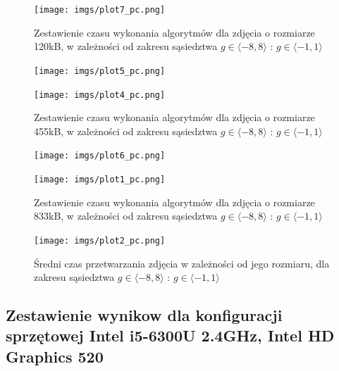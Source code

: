 \documentclass[document.tex]{subfiles}
\begin{document}
\begin{figure}[h]
\texttt{[image: imgs/plot7\_pc.png]}
\caption{Zestawienie czasu wykonania algorytmów dla zdjęcia o rozmiarze 120kB, 
        w zależności od zakresu sąsiedztwa $g\in \langle -8, 8 \rangle$ : $g\in \langle -1, 1 \rangle$ }
\label{fig:results_pc_hybrid}
\end{figure}

\begin{figure}[h]
\texttt{[image: imgs/plot5\_pc.png]}
\caption*{}
\label{fig:results_pc_hybrid}
\end{figure}

\begin{figure}[h]
\texttt{[image: imgs/plot4\_pc.png]}
\caption{Zestawienie czasu wykonania algorytmów dla zdjęcia o rozmiarze 455kB, 
        w zależności od zakresu sąsiedztwa $g\in \langle -8, 8 \rangle$ : $g\in \langle -1, 1 \rangle$ }
\label{fig:results_pc_hybrid}
\end{figure}

\begin{figure}[h]
\texttt{[image: imgs/plot6\_pc.png]}
\caption*{}
\label{fig:results_pc_hybrid}
\end{figure}

\begin{figure}[h]
\texttt{[image: imgs/plot1\_pc.png]}
\caption{Zestawienie czasu wykonania algorytmów dla zdjęcia o rozmiarze 833kB, 
        w zależności od zakresu sąsiedztwa $g\in \langle -8, 8 \rangle$ : $g\in \langle -1, 1 \rangle$ }
\label{fig:results_pc_hybrid}
\end{figure}

\begin{figure}[h]
\texttt{[image: imgs/plot2\_pc.png]}
\caption{Średni czas przetwarzania zdjęcia w zależności od jego rozmiaru, dla zakresu sąsiedztwa $g\in \langle -8, 8 \rangle$ : $g\in \langle -1, 1 \rangle$}
\label{fig:results_pc_hybrid}
\end{figure}



\clearpage
\subsection{Zestawienie wynikow dla konfiguracji sprzętowej 
Intel i5-6300U 2.4GHz, Intel HD Graphics 520}
\end{document}
